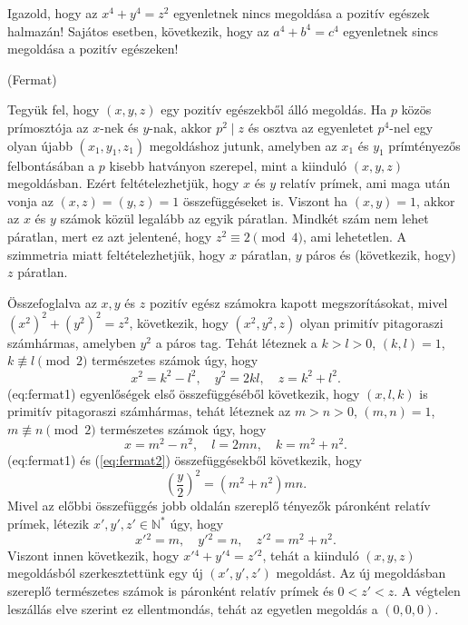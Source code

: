 \begin{extraproblem}
	\label{fel:fermat1} Igazold, hogy az $x^{4}+y^{4}=z^{2}$ egyenletnek
	nincs megoldása a pozitív egészek halmazán! Sajátos esetben, következik,
	hogy az $a^{4}+b^{4}=c^{4}$ egyenletnek sincs megoldása a pozitív
	egészeken! 
	\begin{flushright}
		(Fermat) 
		\par\end{flushright}
\end{extraproblem}

\begin{solution}
	Tegyük fel, hogy $(x,y,z)$ egy pozitív egészekből álló megoldás.
	Ha $p$ közös prímosztója az $x$-nek és $y$-nak, akkor $p^{2}\mid z$
	és osztva az egyenletet $p^{4}$-nel egy olyan újabb $(x_{1},y_{1},z_{1})$
	megoldáshoz jutunk, amelyben az $x_{1}$ és $y_{1}$ prímtényezős
	felbontásában a $p$ kisebb hatványon szerepel, mint a kiinduló $(x,y,z)$
	megoldásban. Ezért feltételezhetjük, hogy $x$ és $y$ relatív prímek,
	ami maga után vonja az $(x,z)=(y,z)=1$ összefüggéseket is. Viszont
	ha $(x,y)=1$, akkor az $x$ és $y$ számok közül legalább az egyik
	páratlan. Mindkét szám nem lehet páratlan, mert ez azt jelentené,
	hogy $z^{2}\equiv2\pmod 4$, ami lehetetlen. A szimmetria miatt feltételezhetjük,
	hogy $x$ páratlan, $y$ páros és (következik, hogy) $z$ páratlan.
	
	Összefoglalva az $x,y$ és $z$ pozitív egész számokra kapott megszorításokat,
	mivel $(x^{2})^{2}+(y^{2})^{2}=z^{2}$, következik, hogy $(x^{2},y^{2},z)$
	olyan primitív pitagoraszi számhármas, amelyben $y^{2}$ a páros tag.
	Tehát léteznek a $k>l>0$, $(k,l)=1$, $k\not\equiv l\pmod 2$ természetes
	számok úgy, hogy 
	\begin{equation}
		x^{2}=k^{2}-l^{2},\quad y^{2}=2kl,\quad z=k^{2}+l^{2}.\label{eq:fermat1}
	\end{equation}
	\Aref({eq:fermat1}) egyenlőségek első összefüggéséből következik,
	hogy $(x,l,k)$ is primitív pitagoraszi számhármas, tehát léteznek
	az $m>n>0$, $(m,n)=1$, $m\not\equiv n\pmod 2$ természetes számok
	úgy, hogy 
	\begin{equation}
		x=m^{2}-n^{2},\quad l=2mn,\quad k=m^{2}+n^{2}.\label{eq:fermat2}
	\end{equation}
	\Aref({eq:fermat1}) és (\ref{eq:fermat2}) összefüggésekből következik,
	hogy 
	\[
	\left(\frac{y}{2}\right)^{2}=(m^{2}+n^{2})mn.
	\]
	Mivel az előbbi összefüggés jobb oldalán szereplő tényezők páronként
	relatív prímek, létezik $x',y',z'\in\mathbb{N}^{*}$ úgy, hogy 
	\[
	x'{}^{2}=m,\quad y'{}^{2}=n,\quad z'{}^{2}=m^{2}+n^{2}.
	\]
	Viszont innen következik, hogy $x'{}^{4}+y'{}^{4}=z'{}^{2}$, tehát
	a kiinduló $(x,y,z)$ megoldásból szerkesztettünk egy új $(x',y',z')$
	megoldást. Az új megoldásban szereplő természetes számok is páronként
	relatív prímek és $0<z'<z.$ A végtelen leszállás elve szerint ez
	ellentmondás, tehát az egyetlen megoldás a $(0,0,0).$ 
\end{solution}

